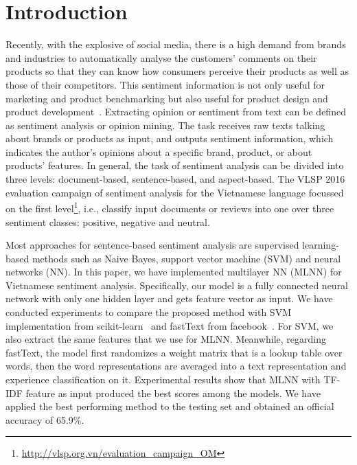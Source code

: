 \documentclass[conference,compsoc]{IEEEtran}
\begin{document}
\section{Introduction}
Recently, with the explosive of social media, there is a high demand from brands and industries to automatically analyse the customers’ comments on their products so that they can know how consumers perceive their products as well as those of their competitors. This sentiment information is not only useful for marketing and product benchmarking but also useful for product design and product development~\cite{liu2012sentiment}. 
Extracting opinion or sentiment from text can be defined as sentiment analysis or opinion mining. The task receives raw texts talking about brands or products as input, and outputs sentiment information, which indicates the author’s opinions about a specific brand, product, or about products’ features. In general, the task of sentiment analysis can be divided into three levels: document-based, sentence-based, and aspect-based. The VLSP 2016 evaluation campaign of sentiment analysis for the Vietnamese language focussed on the first level\footnote{\url{http://vlsp.org.vn/evaluation\_campaign\_OM}}, i.e., classify input documents or reviews into one over three sentiment classes: positive, negative and neutral.

Most approaches for sentence-based sentiment analysis are supervised learning-based methods such as Naive Bayes, support vector machine (SVM) and neural networks (NN). In this paper, we have implemented multilayer NN (MLNN) for Vietnamese sentiment analysis. Specifically, our model is a fully connected neural network with only one hidden layer and gets feature vector as input. We have conducted experiments to compare the proposed method with SVM implementation from scikit-learn~\cite{scikit-learn} and fastText from facebook~\cite{joulin2016bag}. For SVM, we also extract the same features that we use for MLNN. Meanwhile, regarding fastText, the model first randomizes a weight matrix that is a lookup table over words, then the word representations are averaged into a text representation and experience classification on it. Experimental results show that MLNN with TF-IDF feature as input produced the best scores among the models. We have applied the best performing method to the testing set and obtained an official accuracy of 65.9\%.

\end{document}
